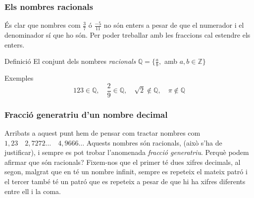 \documentclass{beamer}
\begin{document}
\begin{frame}\frametitle{Els nombres racionals}
És clar que nombres com $\frac{3}{7}$ ó $\frac{-5}{11}$ no són
enters a pesar de que el numerador i el denominador sí que ho són.
Per poder treballar amb les fraccions cal estendre els
enters.\pause
\begin{block}{Definició}
El conjunt dels nombres \emph{racionals}
$\mathbb{Q}=\{\frac{a}{b},$ amb $a, b \in \mathbb{Z}\}$
\end{block}\pause
\begin{exampleblock}{Exemples}
$$123\in \mathbb{Q},\quad \frac{2}{9}\in\mathbb{Q}, \quad \sqrt{2}\notin\mathbb{Q}, \quad
\pi\notin\mathbb{Q}$$
\end{exampleblock}
\end{frame}

\begin{frame}\frametitle{Fracció generatriu d'un nombre decimal}
 Arribats a aquest punt hem de pensar com tractar
nombres com $1,23\quad 2,7272\ldots\quad 4,9666\ldots$ Aquests
nombres són racionals, (això s'ha de justificar), i sempre es pot
trobar l'anomenada \emph{fracció generatriu}. Perquè podem afirmar
que són racionals? Fixem-nos que el primer té dues xifres
decimals, al segon, malgrat que en té un nombre infinit, sempre es
repeteix el mateix patró i el tercer també té un patró que es
repeteix a pesar de que hi ha xifres diferents entre ell i la
coma.
\end{frame}
\end{document}
